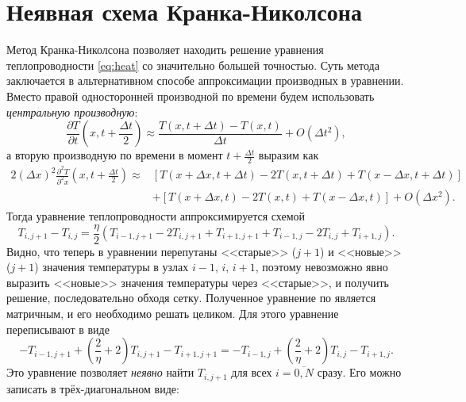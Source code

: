 \documentclass[12pt]{article}
\begin{document}
\section*{Неявная схема Кранка-Николсона}
Метод Кранка-Николсона позволяет находить решение уравнения теплопроводности \eqref{eq:heat} со значительно большей точностью. Суть метода заключается в альтернативном способе аппроксимации производных в уравнении. Вместо правой односторонней производной по времени будем использовать \textit{центральную производную}:
%
\begin{equation}
\frac{\partial T}{\partial t}\left(x,t+\frac{\Delta t}{2}\right)\approx \frac{T(x,t+\Delta t)-T(x,t)}{\Delta t}+O(\Delta t^2),
\end{equation}
%
а вторую производную по времени в момент $t+\frac{\Delta t}{2}$ выразим как
%
\begin{equation}
\begin{split}
2(\Delta x)^2\frac{\partial^2 T}{\partial^2 x}\left(x,t+\frac{\Delta t}{2}\right)\approx & \left[T(x+\Delta x,t+\Delta t)-2T(x,t+\Delta t)+T(x-\Delta x, t+\Delta t)\right]\\
& + \left[T(x+\Delta x,t)-2T(x,t)+T(x-\Delta x, t)\right]+O(\Delta x^2).
\end{split}
\end{equation}
%
Тогда уравнение теплопроводности аппроксимируется схемой
%
\begin{equation}
T_{i,j+1}-T_{i,j}=\frac{\eta}{2}\left(T_{i-1,j+1}-2T_{i,j+1}+T_{i+1,j+1}+T_{i-1,j}-2T_{i,j}+T_{i+1,j}\right).
\end{equation}
%
Видно, что теперь в уравнении перепутаны <<старые>> ($j+1$) и <<новые>> ($j+1$) значения температуры в узлах $i-1,\,i,\,i+1$, поэтому невозможно явно выразить <<новые>> значения температуры через <<старые>>, и получить решение, последовательно обходя сетку. Полученное уравнение по является матричным, и его необходимо решать целиком. Для этого уравнение переписывают в виде
%
\begin{equation}
-T_{i-1,j+1}+\left(\frac{2}{\eta}+2\right)T_{i,j+1}-T_{i+1,j+1}=-T_{i-1,j}+\left(\frac{2}{\eta}+2\right)T_{i,j}-T_{i+1,j}.
\end{equation}
%
Это уравнение позволяет \textit{неявно} найти $T_{i,j+1}$ для всех $i=\overline{0,N}$ сразу. Его можно записать в трёх-диагональном виде:
%
\end{document}
